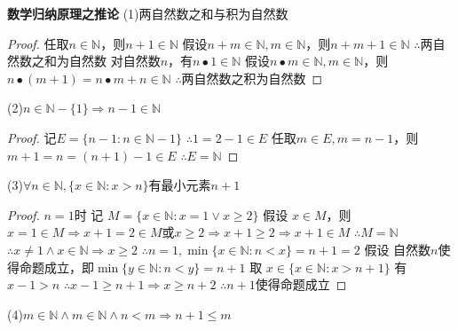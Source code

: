 \documentclass[11pt]{article}
\begin{document}
\textbf{数学归纳原理之推论} \newline
(1)两自然数之和与积为自然数 \newline
\begin{proof}
  任取$n \in \mathbb{N}$，则$n+1 \in \mathbb{N}$ \newline
  假设$n+m \in \mathbb{N}, m \in \mathbb{N}$，则$n+m+1 \in \mathbb{N}$ \newline
  $\therefore$两自然数之和为自然数 \newline
  对自然数$n$，有$n \bullet 1 \in \mathbb{N}$ \newline
  假设$n \bullet m \in \mathbb{N}, m \in \mathbb{N}$，则$n\bullet(m+1)=n\bullet m+n \in \mathbb{N}$ \newline
  $\therefore$两自然数之积为自然数
\end{proof}
(2)$n \in \mathbb{N}-\{1\} \Rightarrow n-1 \in \mathbb{N}$ \newline
\begin{proof}
  记$E=\{n-1:n\in \mathbb{N}-{1}\}$ \newline
  $\therefore 1=2-1 \in E$ \newline
  任取$m \in E, m=n-1$，则$m+1=n=(n+1)-1 \in E$ \newline
  $\therefore E=\mathbb{N}$
\end{proof}
(3)$\forall n \in \mathbb{N}, \{x\in\mathbb{N}:x>n\}$有最小元素$n+1$ \newline
\begin{proof}
  $n=1$时 \newline
  记 $M=\{x\in\mathbb{N}: x=1 \lor x\ge2\}$ \newline
  假设 $x\in M$，则$x=1\in M\Rightarrow x+1=2\in M$或$x\ge2\Rightarrow x+1\ge2\Rightarrow x+1\in M$ \newline
  $\therefore M=\mathbb{N}$ \newline
  $\therefore x\not = 1\land x\in\mathbb{N}\Rightarrow x\ge2$ \newline
  $\therefore n=1, \min\{x\in\mathbb{N}:n<x\}=n+1=2$ \newline
  假设 自然数$n$使得命题成立，即$\min\{y\in\mathbb{N}:n<y\}=n+1$ \newline
  取 $x\in\{x\in\mathbb{N}:x>n+1\}$ \newline
  有 $x-1>n$ \newline
  $\therefore x-1\ge n+1\Rightarrow x\ge n+2$ \newline
  $\therefore$$n+1$使得命题成立
\end{proof}
(4)$m\in\mathbb{N} \land m\in\mathbb{N} \land n<m \Rightarrow n+1\le m$ \newline
\end{document}
